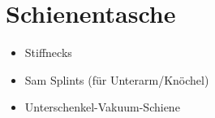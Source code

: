 \section{Schienentasche}
\begin{itemize}
    \item Stiffnecks
    \item Sam Splints (für Unterarm/Knöchel)
    \item Unterschenkel-Vakuum-Schiene
\end{itemize}
